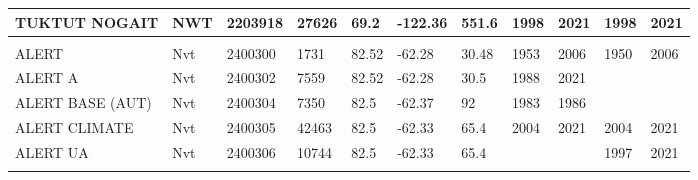 \documentclass[12pt, oneside]{article}
\begin{document}
\begin{landscape}
\begin{table}
{\begin{tabular}{|l|l|l|l|l|l|l|l|l|l|l|}
TUKTUT NOGAIT    & NWT               & 2203918             & 27626               & 69.2                           & -122.36                         & 551.6                  & 1998                    & 2021                   & 1998                    & 2021                   \\ \hline
                 &                   &                     &                     &                                &                                 &                        &                         &                        &                         &                        \\ \hline
ALERT            & Nvt               & 2400300             & 1731                & 82.52                          & -62.28                          & 30.48                  & 1953                    & 2006                   & 1950                    & 2006                   \\ \hline
ALERT A          & Nvt               & 2400302             & 7559                & 82.52                          & -62.28                          & 30.5                   & 1988                    & 2021                   &                         &                        \\ \hline
ALERT BASE (AUT) & Nvt               & 2400304             & 7350                & 82.5                           & -62.37                          & 92                     & 1983                    & 1986                   &                         &                        \\ \hline
ALERT CLIMATE    & Nvt               & 2400305             & 42463               & 82.5                           & -62.33                          & 65.4                   & 2004                    & 2021                   & 2004                    & 2021                   \\ \hline
ALERT UA         & Nvt               & 2400306             & 10744               & 82.5                           & -62.33                          & 65.4                   &                         &                        & 1997                    & 2021                   \\ \hline
                 &                   &                     &                     &                                &                                 &                        &                         &                        &                         &                        \\ \hline

\end{tabular}}
\end{table}
\end{landscape}
\end{document}
